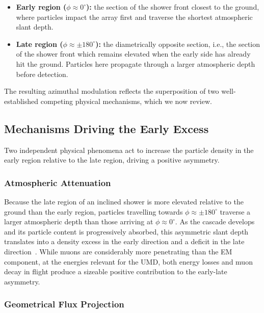 \documentclass[11pt,a4paper]{article}
\begin{document}
\begin{itemize}
\item \textbf{Early region ($\phi \approx 0^{\circ}$):} the section of the shower front closest to the ground, where particles impact the array first and traverse the shortest atmospheric slant depth.
\item \textbf{Late region ($\phi \approx \pm 180^{\circ}$):} the diametrically opposite section, i.e., the section of the shower front which remains elevated when the early side has already hit the ground. Particles here propagate through a larger atmospheric depth before detection.
\end{itemize}

The resulting azimuthal modulation reflects the superposition of two well-established competing physical mechanisms, which we now review.

\subsection{Mechanisms Driving the Early Excess}
\label{subsec:early_excess}

Two independent physical phenomena act to increase the particle density in the early region relative to the late region, driving a positive asymmetry.

\subsubsection{Atmospheric Attenuation}

Because the late region of an inclined shower is more elevated relative to the ground than the early region, particles travelling towards $\phi \approx \pm 180^{\circ}$ traverse a larger atmospheric depth than those arriving at $\phi \approx 0^{\circ}$. As the cascade develops and its particle content is progressively absorbed, this asymmetric slant depth translates into a density excess in the early direction and a deficit in the late direction~\cite{Pryke1998,dova2003,BradfieldThesis}. While muons are considerably more penetrating than the EM component, at the energies relevant for the UMD, both energy losses and muon decay in flight produce a sizeable positive contribution to the early-late asymmetry.

\subsubsection{Geometrical Flux Projection}
\end{document}
